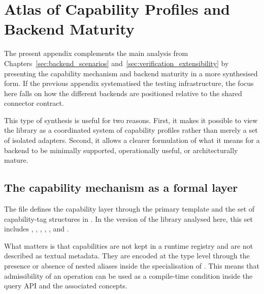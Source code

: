 \section{Atlas of Capability Profiles and Backend Maturity}
\label{sec:capability_atlas_appendix}

The present appendix complements the main analysis from Chapters~\ref{sec:backend_scenarios} and~\ref{sec:verification_extensibility} by presenting the capability mechanism and backend maturity in a more synthesised form. If the previous appendix systematised the testing infrastructure, the focus here falls on how the different backends are positioned relative to the shared connector contract.

This type of synthesis is useful for two reasons. First, it makes it possible to view the library as a coordinated system of capability profiles rather than merely a set of isolated adapters. Second, it allows a clearer formulation of what it means for a backend to be minimally supported, operationally useful, or architecturally mature.

\subsection{The capability mechanism as a formal layer}

The file  defines the capability layer through the primary template  and the set of capability-tag structures in . In the version of the library analysed here, this set includes , , , , , and .

What matters is that capabilities are not kept in a runtime registry and are not described as textual metadata. They are encoded at the type level through the presence or absence of nested aliases inside the specialisation of . This means that admissibility of an operation can be used as a compile-time condition inside the query API and the associated concepts.


